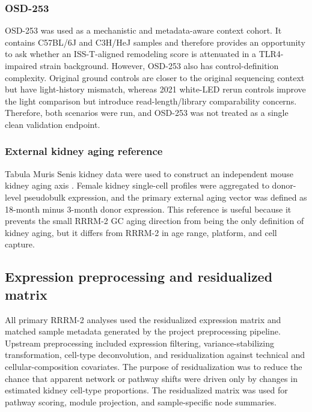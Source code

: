 \documentclass[11pt]{article}
\begin{document}
\subsubsection{OSD-253}

OSD-253 was used as a mechanistic and metadata-aware context cohort. It contains C57BL/6J and C3H/HeJ samples and therefore provides an opportunity to ask whether an ISS-T-aligned remodeling score is attenuated in a TLR4-impaired strain background. However, OSD-253 also has control-definition complexity. Original ground controls are closer to the original sequencing context but have light-history mismatch, whereas 2021 white-LED rerun controls improve the light comparison but introduce read-length/library comparability concerns. Therefore, both scenarios were run, and OSD-253 was not treated as a single clean validation endpoint.

\subsubsection{External kidney aging reference}

Tabula Muris Senis kidney data were used to construct an independent mouse kidney aging axis \citep{tabula2020}. Female kidney single-cell profiles were aggregated to donor-level pseudobulk expression, and the primary external aging vector was defined as 18-month minus 3-month donor expression. This reference is useful because it prevents the small RRRM-2 GC aging direction from being the only definition of kidney aging, but it differs from RRRM-2 in age range, platform, and cell capture.

\subsection{Expression preprocessing and residualized matrix}

All primary RRRM-2 analyses used the residualized expression matrix and matched sample metadata generated by the project preprocessing pipeline. Upstream preprocessing included expression filtering, variance-stabilizing transformation, cell-type deconvolution, and residualization against technical and cellular-composition covariates. The purpose of residualization was to reduce the chance that apparent network or pathway shifts were driven only by changes in estimated kidney cell-type proportions. The residualized matrix was used for pathway scoring, module projection, and sample-specific node summaries.
\end{document}
